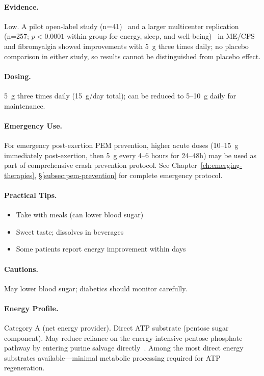 \paragraph{Evidence.} Low. A pilot open-label study (n=41)~\cite{Teitelbaum2006ribose} and a larger multicenter replication (n=257; $p < 0.0001$ within-group for energy, sleep, and well-being)~\cite{Teitelbaum2012ribose} in ME/CFS and fibromyalgia showed improvements with 5~g three times daily; no placebo comparison in either study, so results cannot be distinguished from placebo effect.

\paragraph{Dosing.} 5~g three times daily (15~g/day total); can be reduced to 5--10~g daily for maintenance.

\paragraph{Emergency Use.} For emergency post-exertion PEM prevention, higher acute doses (10--15~g immediately post-exertion, then 5~g every 4--6 hours for 24--48h) may be used as part of comprehensive crash prevention protocol. See Chapter~\ref{ch:emerging-therapies}, \S\ref{subsec:pem-prevention} for complete emergency protocol.

\paragraph{Practical Tips.}
\begin{itemize}
    \item Take with meals (can lower blood sugar)
    \item Sweet taste; dissolves in beverages
    \item Some patients report energy improvement within days
\end{itemize}

\paragraph{Cautions.} May lower blood sugar; diabetics should monitor carefully.

\paragraph{Energy Profile.}
Category A (net energy provider). Direct ATP substrate (pentose sugar component). May reduce reliance on the energy-intensive pentose phosphate pathway by entering purine salvage directly~\cite{Dodd2004ribose}. Among the most direct energy substrates available---minimal metabolic processing required for ATP regeneration.

